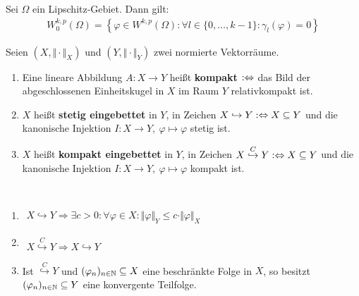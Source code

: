 \begin{satz}
	Sei $\Omega$ ein Lipschitz-Gebiet. 
	Dann gilt:
	\begin{align*}
		W_0^{k,p}(\Omega)=\left\lbrace\varphi\in W^{k,p}(\Omega):
		\forall l\in\lbrace0,\ldots,k-1\rbrace:\gamma_l(\varphi)=0\right\rbrace
	\end{align*}
\end{satz}

\begin{definition}
	Seien $(X,\Vert\cdot\Vert_X)$ und $(Y,\Vert\cdot\Vert_Y)$ zwei normierte Vektorräume.
	\begin{enumerate}
		\item Eine lineare Abbildung $A:X\to Y$ heißt \textbf{kompakt} $:\Leftrightarrow$ das Bild der abgeschlossenen Einheitskugel in $X$ im Raum $Y$ relativkompakt ist.
		\item $X$ heißt \textbf{stetig eingebettet} in $Y$, in Zeichen $X\hookrightarrow Y:\Leftrightarrow X\subseteq Y$ und die kanonische Injektion $I:X\to Y,~\varphi\mapsto\varphi$ stetig ist.
		\item $X$ heißt \textbf{kompakt eingebettet} in $Y$, in Zeichen $X\stackrel{C}{\hookrightarrow} Y:\Leftrightarrow X\subseteq Y$ und die kanonische Injektion $I:X\to Y,~\varphi\mapsto\varphi$ kompakt ist.
	\end{enumerate}
\end{definition}

\begin{bemerkung}\
	\begin{enumerate}
		\item $\begin{aligned}
			X\hookrightarrow Y\Longrightarrow\exists c>0:\forall\varphi\in X:\Vert\varphi\Vert_Y\leq c\cdot\Vert\varphi\Vert_X
		\end{aligned}$
		\item $\begin{aligned}
			X\stackrel{C}{\hookrightarrow} Y\Longrightarrow X\hookrightarrow Y
		\end{aligned}$
		\item Ist $\stackrel{C}{\hookrightarrow} Y$ und $(\varphi_n)_{n\in\mathbb{N}}\subseteq X$ eine beschränkte Folge in $X$, so besitzt $(\varphi_n)_{n\in\mathbb{N}}\subseteq Y$ eine konvergente Teilfolge.
	\end{enumerate}
\end{bemerkung}

